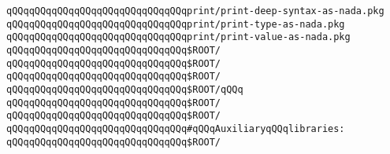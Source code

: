 \verb|qQQqqQQqqQQqqQQqqQQqqQQqqQQqqQQqprint/print-deep-syntax-as-nada.pkg|\newline
\verb|qQQqqQQqqQQqqQQqqQQqqQQqqQQqqQQqprint/print-type-as-nada.pkg|\newline
\verb|qQQqqQQqqQQqqQQqqQQqqQQqqQQqqQQqprint/print-value-as-nada.pkg|\newline
\newline
\verb|qQQqqQQqqQQqqQQqqQQqqQQqqQQqqQQq$ROOT/|\newline
\verb|qQQqqQQqqQQqqQQqqQQqqQQqqQQqqQQq$ROOT/|\newline
\verb|qQQqqQQqqQQqqQQqqQQqqQQqqQQqqQQq$ROOT/|\newline
\newline
\verb|qQQqqQQqqQQqqQQqqQQqqQQqqQQqqQQq$ROOT/|\verb|qQQq|\newline
\newline
\verb|qQQqqQQqqQQqqQQqqQQqqQQqqQQqqQQq$ROOT/|\newline
\newline
\verb|qQQqqQQqqQQqqQQqqQQqqQQqqQQqqQQq$ROOT/|\newline
\newline
\verb|qQQqqQQqqQQqqQQqqQQqqQQqqQQqqQQq#qQQqAuxiliaryqQQqlibraries:|\newline
\verb|qQQqqQQqqQQqqQQqqQQqqQQqqQQqqQQq$ROOT/|\newline

